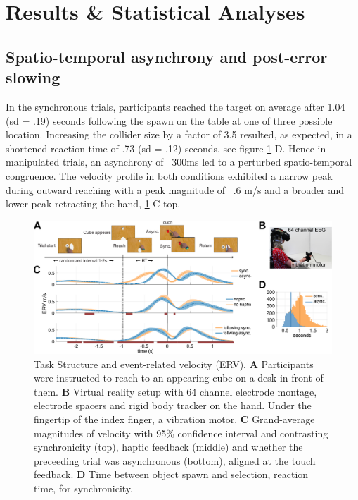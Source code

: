 \section{Results \& Statistical Analyses}
\subsection{Spatio-temporal asynchrony and post-error slowing}

In the synchronous trials, participants reached the target on average after 1.04 (sd = .19) seconds following the spawn on the table at one of three possible location. Increasing the collider size by a factor of 3.5 resulted, as expected, in a shortened reaction time of .73 (sd = .12) seconds, see figure \ref{velocity} D. Hence in manipulated trials, an asynchrony of ~300ms led to a perturbed spatio-temporal congruence. The velocity profile in both conditions exhibited a narrow peak during outward reaching with a peak magnitude of ~.6 m/s and a broader and lower peak retracting the hand, \ref{velocity} C top.


\begin{figure}[t]
  \includegraphics[width=\textwidth]{figures/fig1_behavior.pdf}
  \caption{Task Structure and event-related velocity (ERV). \textbf{A} Participants were instructed to reach to an appearing cube on a desk in front of them. \textbf{B} Virtual reality setup with 64 channel electrode montage, electrode spacers and rigid body tracker on the hand. Under the fingertip of the index finger, a vibration motor. \textbf{C} Grand-average magnitudes of velocity with 95\% confidence interval and contrasting synchronicity (top), haptic feedback (middle) and whether the preceeding trial was asynchronous (bottom), aligned at the touch feedback. \textbf{D} Time between object spawn and selection, reaction time, for synchronicity.}
  \label{velocity}
\end{figure}

